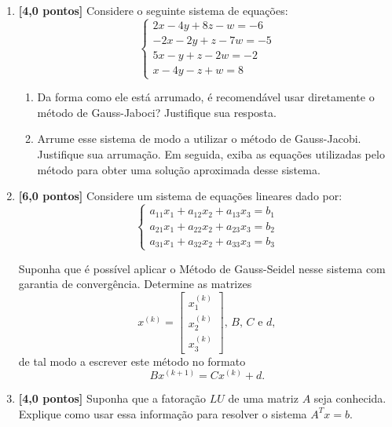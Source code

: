 \documentclass[12pt,a4paper]{article}
\begin{document}
\begin{enumerate}
 \item \textbf{[4,0 pontos]} Considere o seguinte sistema de equações:
  $$%
   \begin{cases}
    2x - 4y + 8z  - w = -6 \\
    -2x  - 2y + z - 7w = -5 \\
    5x  - y + z - 2w = -2 \\
    x - 4y - z + w = 8
   \end{cases}
  $$

  \begin{enumerate}
   \item Da forma como ele está arrumado, é recomendável usar diretamente o método de Gauss-Jaboci? Justifique sua resposta.
   \item Arrume esse sistema de modo a utilizar o método de Gauss-Jacobi. Justifique sua arrumação. Em seguida, exiba as equações 
         utilizadas pelo método para obter uma solução aproximada desse sistema.
  \end{enumerate}

 \item \textbf{[6,0 pontos]} Considere um sistema de equações lineares dado por:
$$\begin{cases}
   a_{11}x_1 + a_{12}x_2 + a_{13}x_3 = b_1 \\
   a_{21}x_1 + a_{22}x_2 + a_{23}x_3 = b_2 \\
   a_{31}x_1 + a_{32}x_2 + a_{33}x_3 = b_3
  \end{cases}
$$

Suponha que é possível aplicar o Método de Gauss-Seidel nesse sistema com garantia de convergência. Determine as matrizes 
$$x^{(k)} = \begin{bmatrix} x^{(k)}_1 \\ x^{(k)}_2 \\ x^{(k)}_3\end{bmatrix}, \,B,\, C \textrm{ e } d,$$ 
de tal modo a escrever este método no formato $$Bx^{(k+1)} = Cx^{(k)} + d.$$

 \item \textbf{[4,0 pontos]} Suponha que a fatoração $LU$ de uma matriz $A$ seja conhecida. Explique como usar essa informação para resolver o 
sistema $A^Tx = b$.

\end{enumerate}
\end{document}

